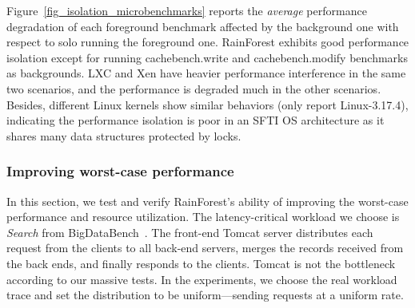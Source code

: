 \documentclass[pageno]{jpaper}
\begin{document}
Figure~\ref{fig_isolation_microbenchmarks} reports the \emph{average} performance degradation of each foreground benchmark affected by the background one with respect to solo running the foreground one. RainForest exhibits good performance isolation except for running cachebench.write and cachebench.modify benchmarks as backgrounds. LXC and Xen have heavier performance interference in the same two scenarios, and the performance is degraded much in the other scenarios. Besides, different Linux kernels show similar behaviors (only report Linux-3.17.4), indicating the performance isolation is poor in an SFTI OS architecture as it shares many data structures  protected by locks.




\begin{figure*}[t]
\setlength{\abovecaptionskip}{3pt}
\setlength{\belowcaptionskip}{0pt}
\centering
{}
    \caption{Performance degradation of co-running two benchmarks on a single server. Numbers 010 on the both \emph{x-} and \emph{y-} axes denotes \emph{SPECCPU.\{bzip2, sphix3\}}, \emph{cachebench.\{read, write, modify\}}, \emph{IOzone.\{write, read, modify\}}, \emph{netperf.\{tcp\_stream, tcp\_rr, tcp\_crr\}}, respectively. The numbers in the grid are the average performance slow down percentages (\%) when a foreground benchmark on y-axis interfered by a background one on x-axis relative to solo-running a foreground one.}
    \label{fig_isolation_microbenchmarks}
\end{figure*}

\subsubsection{Improving worst-case performance}
In this section, we test and verify RainForest's ability of improving the worst-case performance and resource utilization. The latency-critical workload we choose is \emph{Search} from BigDataBench~\cite{Wang:2014:BigDataBench}. The front-end Tomcat server distributes each request from the clients to all back-end servers, merges the records received from the back ends, and finally responds to the clients. Tomcat is not the bottleneck according to our massive tests. In the experiments, we choose the real workload trace and set the distribution to be uniform---sending  requests at a uniform rate.
\end{document}
